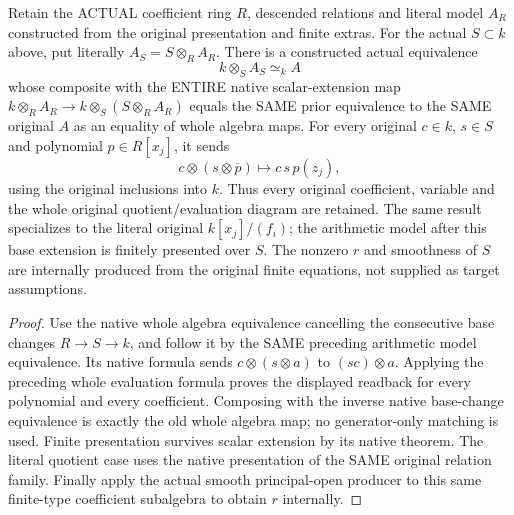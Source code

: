 \begin{theorem}
\label{thm:arithmetic-smooth-base-same-model}
\leanok
{}
Retain the ACTUAL coefficient ring $R$, descended relations and literal
model $A_R$ constructed from the original presentation and finite extras.
For the actual $S\subset k$ above, put literally $A_S=S\otimes_R A_R$.
There is a constructed actual equivalence
\[ k\otimes_S A_S\simeq_k A \]
whose composite with the ENTIRE native scalar-extension map
$k\otimes_R A_R\to k\otimes_S(S\otimes_R A_R)$ equals the SAME prior
equivalence to the SAME original $A$ as an equality of whole algebra maps.
For every original $c\in k$, $s\in S$ and polynomial $p\in R[x_j]$, it sends
\[ c\otimes(s\otimes\overline p)\longmapsto
       c\,s\,p(z_j), \]
using the original inclusions into $k$. Thus every original coefficient,
variable and the whole original quotient/evaluation diagram are retained.
The same result specializes to the literal original $k[x_j]/(f_i)$;
the arithmetic model after this base extension is finitely presented over $S$.
The nonzero $r$ and smoothness of $S$ are internally produced from the
original finite equations, not supplied as target assumptions.
\end{theorem}
\begin{proof}
Use the native whole algebra equivalence cancelling the consecutive base
changes $R\to S\to k$, and follow it by the SAME preceding arithmetic
model equivalence. Its native formula sends $c\otimes(s\otimes a)$ to
$(s c)\otimes a$. Applying the preceding whole evaluation formula proves
the displayed readback for every polynomial and every coefficient.
Composing with the inverse native base-change equivalence is exactly the
old whole algebra map; no generator-only matching is used. Finite
presentation survives scalar extension by its native theorem. The literal
quotient case uses the native presentation of the SAME original relation
family. Finally apply the actual smooth principal-open producer to this
same finite-type coefficient subalgebra to obtain $r$ internally.
\end{proof}

